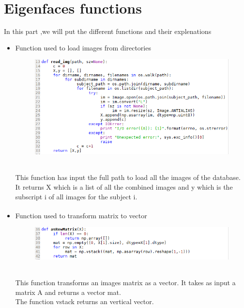 \section{Eigenfaces functions}
In this part ,we will put the different functions and their explenations
\begin{itemize}
\item Function used to load  images from directories
\begin{figure}[bth]%
\begin{center}
\includegraphics[scale=0.75]{fonc_ReadImg}%
\label{read_}%
\end {center}
\end{figure}
\\This function has input the full path to load all the images of the database.
It returns X which is a list of all the combined images and y which is the subscript i of all images for the subject i.
\newpage
\paragraph{}
\item  Function used to transform matrix to vector
\begin{figure}[bth]%
\begin{center}
\includegraphics[scale=0.75]{fonc_marixVectors}%
\label{read_}%
\end {center}
\end{figure}
\\This function transforms an  images matrix  as a vector. It takes as input a matrix A and returns a vector mat.
\\The function vstack   returns  an vertical vector.

\end{itemize}
